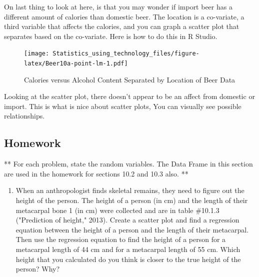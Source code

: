 \documentclass[]{book}
\newenvironment{Shaded}{\begin{snugshade}}{\end{snugshade}}
\newcommand{\DataTypeTok}[1]{\textcolor[rgb]{0.13,0.29,0.53}{#1}}
\newcommand{\KeywordTok}[1]{\textcolor[rgb]{0.13,0.29,0.53}{\textbf{#1}}}
\newcommand{\NormalTok}[1]{#1}
\newcommand{\OperatorTok}[1]{\textcolor[rgb]{0.81,0.36,0.00}{\textbf{#1}}}
\newcommand{\StringTok}[1]{\textcolor[rgb]{0.31,0.60,0.02}{#1}}
\providecommand{\tightlist}{%
  \setlength{\itemsep}{0pt}\setlength{\parskip}{0pt}}
\begin{document}
On last thing to look at here, is that you may wonder if import beer has a different amount of calories than domestic beer. The location is a co-variate, a third variable that affects the calories, and you can graph a scatter plot that separates based on the co-variate. Here is how to do this in R Studio.



\begin{Shaded}
\end{Shaded}

\begin{figure}
\centering
\texttt{[image: Statistics\_using\_technology\_files/figure-latex/Beer10a-point-lm-1.pdf]}
\caption{\label{fig:Beer10a-point-lm}Calories versus Alcohol Content Separated by Location of Beer Data}
\end{figure}

Looking at the scatter plot, there doesn't appear to be an affect from domestic or import. This is what is nice about scatter plots, You can visually see possible relationships.

\hypertarget{homework-29}{%
\subsection{Homework}\label{homework-29}}

** For each problem, state the random variables. The Data Frame in this section are used
in the homework for sections 10.2 and 10.3 also. **

\begin{enumerate}
\def\labelenumi{\arabic{enumi}.}
\tightlist
\item
  When an anthropologist finds skeletal remains, they need to figure out the height of the person. The height of a person (in cm) and the length of their metacarpal bone 1 (in cm) were collected and are in table \#10.1.3 ("Prediction of height," 2013). Create a scatter plot and find a regression equation between the height of a person and the length of their metacarpal. Then use the regression equation to find the height of a person for a metacarpal length of 44 cm and for a metacarpal length of 55 cm. Which height that you calculated do you think is closer to the true height of the person? Why?
\end{enumerate}
\end{document}
